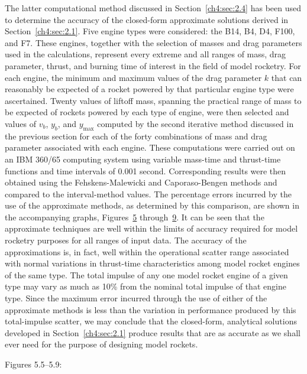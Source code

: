 The latter computational method discussed in Section~\ref{ch4:sec:2.4} has been used to determine the
accuracy of the closed-form approximate solutions derived in Section~\ref{ch4:sec:2.1}. Five engine types
were considered: the B14, B4, D4, F100, and F7. These engines, together with the selection of masses and
drag parameters used in the calculations, represent every extreme and all ranges of mass, drag parameter,
thrust, and burning time of interest in the field of model rocketry. For each engine, the minimum and
maximum values of the drag parameter $k$ that can reasonably be expected of a rocket powered by that
particular engine type were ascertained. Twenty values of liftoff mass, spanning the practical range of
mass to be expected of rockets powered by each type of engine, were then selected and values of $v_b$,
$y_b$, and $y_{\max}$ computed by the second iterative method discussed in the previous section for each of
the forty combinations of mass and drag parameter associated with each engine. These computations were
carried out on an IBM 360/65 computing system using variable mass-time and thrust-time functions and time
intervals of 0.001 second. Corresponding results were then obtained using the Fehskens-Malewicki and
Caporaso-Bengen methods and compared to the interval-method values. The percentage errors incurred by the
use of the approximate methods, as determined by this comparison, are shown in the accompanying graphs,
Figures~\hyperref[ch4:fig:5a]{5} through~\hyperref[ch4:fig:9a]{9}. It can be seen that the approximate
techniques are well within the limits of accuracy required for model rocketry purposes for all ranges of
input data. The accuracy of the approximations is, in fact, well within the operational scatter range
associated with normal variations in thrust-time characteristics among model rocket engines of the same
type. The total impulse of any one model rocket engine of a given type may vary as much as 10\% from the
nominal total impulse of that engine type. Since the maximum error incurred through the use of either of
the approximate methods is less than the variation in performance produced by this total-impulse scatter,
we may conclude that the closed-form, analytical solutions developed in Section~\ref{ch4:sec:2.1} produce
results that are as accurate as we shall ever need for the purpose of designing model rockets.

\medskip
\noindent Figures 5.5--5.9:

